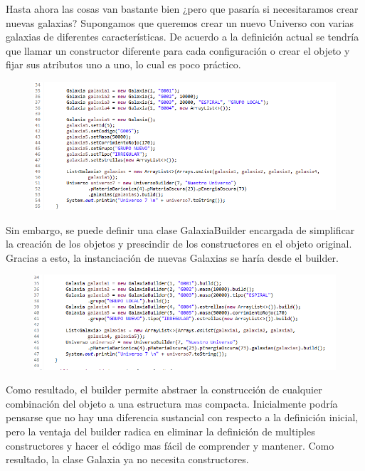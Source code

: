 Hasta ahora las cosas van bastante bien ¿pero que pasaría si necesitaramos crear nuevas galaxias? Supongamos que queremos crear un nuevo Universo con varias galaxias de diferentes características. De acuerdo a la definición actual se tendría que llamar un constructor diferente para cada configuración o crear el objeto y fijar sus atributos uno a uno, lo cual es poco práctico.

\begin{figure}[H]
	\includegraphics{images/creational/builder/builderExample8.png}
\end{figure}

Sin embargo, se puede definir una clase GalaxiaBuilder encargada de simplificar la creación de los objetos y prescindir de los constructores en el objeto original. Gracias a esto, la instanciación de nuevas Galaxias se haría desde el builder.

\begin{figure}[H]
	\includegraphics{images/creational/builder/builderExample9.png}
\end{figure}

Como resultado, el builder permite abstraer la construcción de cualquier combinación del objeto a una estructura mas compacta. Inicialmente podría pensarse que no hay una diferencia sustancial con respecto a la definición inicial, pero la ventaja del builder radica en eliminar la definición de multiples constructores y hacer el código mas fácil de comprender y mantener. Como resultado, la clase Galaxia ya no necesita constructores.

